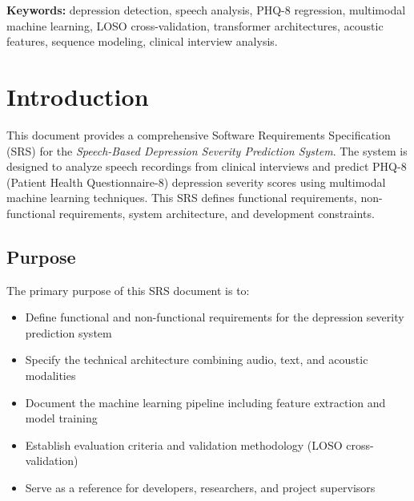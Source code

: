 \documentclass[12pt]{article}
\begin{document}
	\vspace{1em}
	\noindent
	\textbf{Keywords:} depression detection, speech analysis, PHQ-8 regression, multimodal machine learning, LOSO cross-validation, transformer architectures, acoustic features, sequence modeling, clinical interview analysis.

	\newpage



	\tableofcontents

	\newpage

	\setcounter{page}{1}


	\section{Introduction}

	This document provides a comprehensive Software Requirements Specification (SRS) for the \textit{Speech-Based Depression Severity Prediction System}. The system is designed to analyze speech recordings from clinical interviews and predict PHQ-8 (Patient Health Questionnaire-8) depression severity scores using multimodal machine learning techniques. This SRS defines functional requirements, non-functional requirements, system architecture, and development constraints.

	\subsection{Purpose}

	The primary purpose of this SRS document is to:

	\begin{itemize}
		\item Define functional and non-functional requirements for the depression severity prediction system
		\item Specify the technical architecture combining audio, text, and acoustic modalities
		\item Document the machine learning pipeline including feature extraction and model training
		\item Establish evaluation criteria and validation methodology (LOSO cross-validation)
		\item Serve as a reference for developers, researchers, and project supervisors
	\end{itemize}
\end{document}
